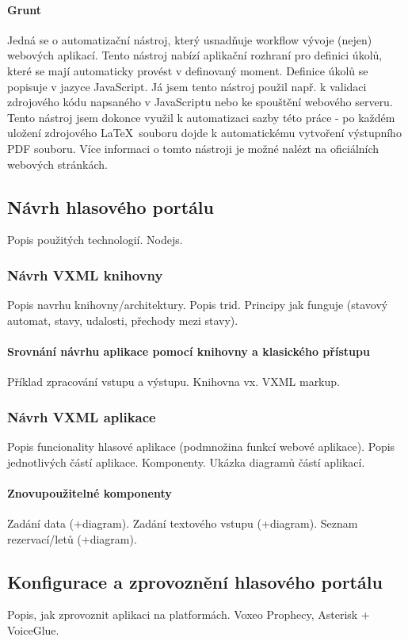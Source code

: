 \documentclass[ing,male,java,dept460]{diploma}						%
\begin{document}
\paragraph{Grunt}
Jedná se o automatizační nástroj, který usnadňuje workflow vývoje (nejen) webových aplikací. Tento nástroj nabízí aplikační rozhraní pro definici úkolů, které se mají automaticky provést v definovaný moment. Definice úkolů se popisuje v jazyce JavaScript. Já jsem tento nástroj použil např. k validaci zdrojového kódu napsaného v JavaScriptu nebo ke spouštění webového serveru. Tento nástroj jsem dokonce využil k automatizaci sazby této práce - po každém uložení zdrojového \LaTeX\ souboru dojde k automatickému vytvoření výstupního PDF souboru. Více informaci o tomto nástroji je možné nalézt na oficiálních webových stránkách\cite{grunt}.

\subsection{Návrh hlasového portálu}
Popis použitých technologií. Nodejs.

\subsubsection{Návrh VXML knihovny}
Popis navrhu knihovny/architektury. Popis trid. Principy jak funguje (stavový automat, stavy, udalosti, přechody mezi stavy).

\paragraph{Srovnání návrhu aplikace pomocí knihovny a klasického přístupu}
Příklad zpracování vstupu a výstupu. Knihovna vx. VXML markup.

\subsubsection{Návrh VXML aplikace}
Popis funcionality hlasové aplikace (podmnožina funkcí webové aplikace). Popis jednotlivých částí aplikace. Komponenty. Ukázka diagramů částí aplikací.

\paragraph{Znovupoužitelné komponenty}
Zadání data (+diagram). Zadání textového vstupu (+diagram). Seznam rezervací/letů (+diagram).

\subsection{Konfigurace a zprovoznění hlasového portálu}
Popis, jak zprovoznit aplikaci na platformách. Voxeo Prophecy, Asterisk + VoiceGlue.
\end{document}

